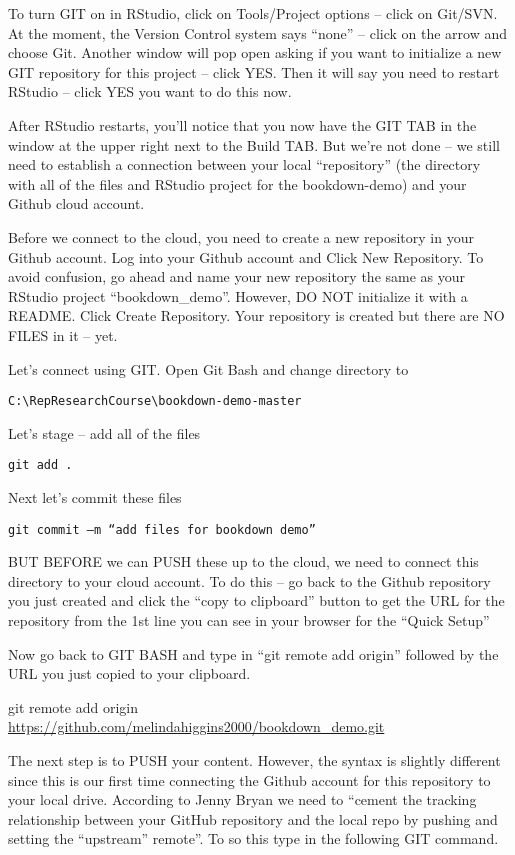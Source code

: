 \documentclass[]{book}
\theoremstyle{definition}
\theoremstyle{definition}
\theoremstyle{definition}
\theoremstyle{remark}
\begin{document}
To turn GIT on in RStudio, click on Tools/Project options -- click on
Git/SVN. At the moment, the Version Control system says ``none'' --
click on the arrow and choose Git. Another window will pop open asking
if you want to initialize a new GIT repository for this project -- click
YES. Then it will say you need to restart RStudio -- click YES you want
to do this now.

After RStudio restarts, you'll notice that you now have the GIT TAB in
the window at the upper right next to the Build TAB. But we're not done
-- we still need to establish a connection between your local
``repository'' (the directory with all of the files and RStudio project
for the bookdown-demo) and your Github cloud account.

Before we connect to the cloud, you need to create a new repository in
your Github account. Log into your Github account and Click New
Repository. To avoid confusion, go ahead and name your new repository
the same as your RStudio project ``bookdown\_demo''. However, DO NOT
initialize it with a README. Click Create Repository. Your repository is
created but there are NO FILES in it -- yet.

Let's connect using GIT. Open Git Bash and change directory to

\texttt{C:\textbackslash{}RepResearchCourse\textbackslash{}bookdown-demo-master}

Let's stage -- add all of the files

\texttt{git\ add\ .}

Next let's commit these files

\texttt{git\ commit\ –m\ “add\ files\ for\ bookdown\ demo”}

BUT BEFORE we can PUSH these up to the cloud, we need to connect this
directory to your cloud account. To do this -- go back to the Github
repository you just created and click the ``copy to clipboard'' button
to get the URL for the repository from the 1st line you can see in your
browser for the ``Quick Setup''

Now go back to GIT BASH and type in ``git remote add origin'' followed
by the URL you just copied to your clipboard.

git remote add origin
\url{https://github.com/melindahiggins2000/bookdown_demo.git}

The next step is to PUSH your content. However, the syntax is slightly
different since this is our first time connecting the Github account for
this repository to your local drive. According to Jenny Bryan we need to
``cement the tracking relationship between your GitHub repository and
the local repo by pushing and setting the ``upstream'' remote''. To so
this type in the following GIT command.
\end{document}
